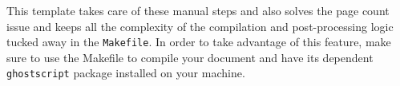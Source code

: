 This template takes care of these manual steps and also solves the page count issue and keeps all the complexity of the compilation and post-processing logic tucked away in the \texttt{Makefile}.
In order to take advantage of this feature, make sure to use the Makefile to compile your document and have its dependent \texttt{ghostscript} package installed on your machine.

